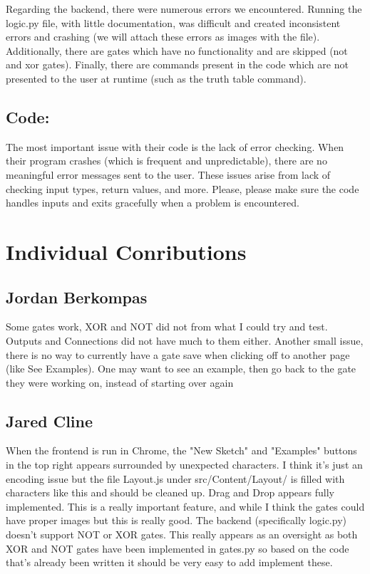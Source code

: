 \documentclass[11pt]{article}
\begin{document}
            Regarding the backend, there were numerous errors we encountered. Running the logic.py file, with little documentation, was difficult and created inconsistent errors and crashing (we will attach these errors as images with the file). Additionally, there are gates which have no functionality and are skipped (not and xor gates). Finally, there are commands present in the code which are not presented to the user at runtime (such as the truth table command).

        \subsection*{Code:}
            The most important issue with their code is the lack of error checking. When their program crashes (which is frequent and unpredictable), there are no meaningful error messages sent to the user. These issues arise from lack of checking input types, return values, and more. Please, please make sure the code handles inputs and exits gracefully when a problem is encountered.

    \section*{Individual Conributions}
        \subsection*{Jordan Berkompas}
            Some gates work, XOR and NOT did not from what I could try and test. Outputs and Connections did not have much to them either. Another small issue, there is no way to currently have a gate save when clicking off to another page (like See Examples). One may want to see an example, then go back to the gate they were working on, instead of starting over again

        \subsection*{Jared Cline}
            When the frontend is run in Chrome, the "New Sketch" and "Examples" buttons in the top right appears surrounded by unexpected characters.
            I think it's just an encoding issue but the file Layout.js under src/Content/Layout/ is filled with characters like this and should be cleaned up. Drag and Drop appears fully implemented. This is a really important feature, and while I think the gates could have proper images but this is really good. The backend (specifically logic.py) doesn't support NOT or XOR gates. This really appears as an oversight as both XOR and NOT gates have been implemented in gates.py so based on the code that's already been written it should be very easy to add implement these.
\end{document}
